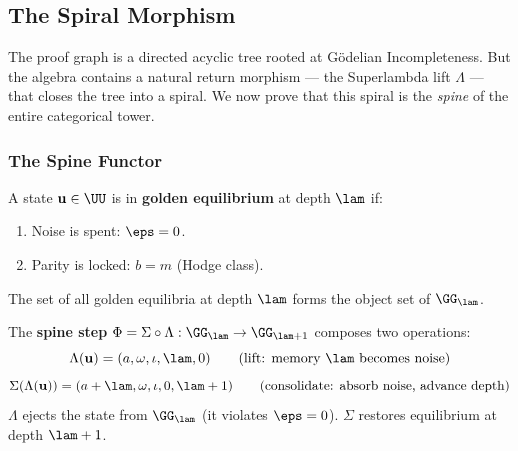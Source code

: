 \subsection{The Spiral Morphism}

The proof graph is a directed acyclic tree rooted at G\"odelian Incompleteness. But the algebra contains a natural return morphism --- the Superlambda lift $\Lambda$ --- that closes the tree into a spiral. We now prove that this spiral is the \emph{spine} of the entire categorical tower.

\subsubsection*{The Spine Functor}

\begin{definition}\label{def:golden-eq}
A state $\mathbf{u} \in \UU$ is in \textbf{golden equilibrium} at depth $\lam$ if:
\begin{enumerate}
\item Noise is spent: $\eps = 0$.
\item Parity is locked: $b = m$ (Hodge class).
\end{enumerate}
The set of all golden equilibria at depth $\lam$ forms the object set of $\GG_{\lam}$.
\end{definition}

\begin{definition}\label{def:spine}
The \textbf{spine step} $\Phi = \Sigma \circ \Lambda : \GG_{\lam} \to \GG_{\lam+1}$ composes two operations:
$$\Lambda(\mathbf{u}) = (a, \omega, \iota, \lam, 0) \qquad \text{(lift: memory $\lam$ becomes noise)}$$
$$\Sigma(\Lambda(\mathbf{u})) = (a + \lam, \omega, \iota, 0, \lam + 1) \qquad \text{(consolidate: absorb noise, advance depth)}$$
$\Lambda$ ejects the state from $\GG_{\lam}$ (it violates $\eps = 0$). $\Sigma$ restores equilibrium at depth $\lam + 1$.
\end{definition}

